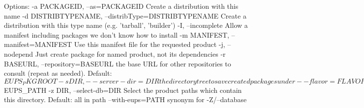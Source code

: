 \documentclass{article}
\let\overbatim=\verbatim
\let\oendverbatim=\endverbatim
\renewenvironment{verbatim}
{\center\minipage{16cm}\overbatim}
{\oendverbatim\endminipage\endcenter}
\begin{document}
\begin{itemize}
\begin{verbatim}
Options:
  -a PACKAGEID, --as=PACKAGEID
                        Create a distribution with this name
  -d DISTRIBTYPENAME, --distribType=DISTRIBTYPENAME
                        Create a distribution with this type name (e.g.
                        'tarball', 'builder')
  -I, --incomplete      Allow a manifest including packages we don't know how
                        to install
  -m MANIFEST, --manifest=MANIFEST
                        Use this manifest file for the requested product
  -j, --nodepend        Just create package for named product, not its
                        dependencies
  -r BASEURL, --repository=BASEURL
                        the base URL for other repositories to consult (repeat
                        as needed).  Default: $EUPS_PKGROOT
  -s DIR, --server-dir=DIR
                        the directory tree to save created packages under
  --flavor=FLAVOR       Assume this target platform flavor (e.g. 'Linux')
  -F, --force           Force requested behaviour
  -D DISTRIBCLASSES, --distrib-class=DISTRIBCLASSES
                        register this Distrib class (repeat as needed)
  -R REBUILDPRODUCTVERSION, --rebuild=REBUILDPRODUCTVERSION
                        Create a new distribution given that product:version's
                        ABI has changed
  --rebuildSuffix=REBUILDSUFFIX
                        Specify suffix to apply to new versions generated by
                        --rebuild
  --server-class=SERVERCLASSES
                        register this DistribServer class (repeat as needed)
  -S SERVEROPTS, --server-option=SERVEROPTS
                        pass a customized option to all repositories (form
                        NAME=VALUE, repeat as needed)
  -e, --exact           Follow the as-installed versions, not the dependencies
                        in the table file
  -f USEFLAVOR, --use-flavor=USEFLAVOR
                        Create an installation specialised to the specified
                        flavor
  -t TAG, --tag=TAG     Set the VRO based on this tag name
  --debug=DEBUG         turn on specified debugging behaviors (allowed: debug,
                        raise)
  -h, --help            show command-line help and exit
  -n, --noaction        Don't actually do anything (for debugging purposes)
  --nolocks             Disable locking of eups's internal files
  -q, --quiet           Suppress messages to user (overrides -v)
  -T SETUPTYPE, --type=SETUPTYPE
                        the setup type to use (e.g. exact)
  -v, --verbose         Print extra messages about progress (repeat for ever
                        more chat)
  -V, --version         Print eups version number
  --vro=LIST            Set the Version Resolution Order
  -Z PATH, --database=PATH
                        The colon-separated list of product stacks (databases)
                        to use. Default: $EUPS_PATH
  -z DIR, --select-db=DIR
                        Select the product paths which contain this directory.
                        Default: all in path
  --with-eups=PATH      synonym for -Z/--database
\end{verbatim}


\end{itemize}
\end{document}
